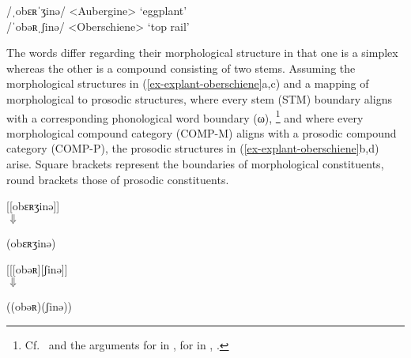 \documentclass[output=paper
 ,nobabel
 ,draftmode
 ,colorlinks, citecolor=brown
]{langscibook}
\begin{document}
/ˌobɛʀˈʒinə/ <Aubergine>    `eggplant'\\

\ex\label{ex-oberschiene}
/ˈobəʀˌʃinə/ <Oberschiene> `top rail'
\zl

\largerpage
\noindent
The words differ regarding their morphological structure in that one is a simplex whereas the other is a compound consisting of two stems. Assuming the morphological structures in (\ref{ex-explant-oberschiene}a,c) and a mapping of morphological to prosodic structures, where every stem (STM) boundary aligns with a corresponding phonological word boundary (ω),%
%
\footnote{Cf.\ \citet{NesporVogel2007} and the arguments for  in \citet{Raffelsiefen1999},
  for  in \citet[cf.\ footnote 12]{Wiese2000}, \citet{Raffelsiefen2000}.} and where every
morphological compound category (COMP-M) aligns with a prosodic compound category (COMP-P), the
prosodic structures in (\ref{ex-explant-oberschiene}b,d) arise. Square brackets represent the
boundaries of morphological constituents, round brackets those of prosodic constituents. 

\ea
\label{ex-explant-oberschiene}
\begin{multicols}{2}
\ea\label{ex-eggplant-stm}
[[obɛʀʒinə]]\\

\hphantom{[[obɛ}$\Downarrow$

\ex\label{ex-eggplant-comp}
(obɛʀʒinə)

\columnbreak

\ex\label{ex-oberschiene-stm}
[[[obəʀ][ʃinə]]\\

\hphantom{[[[obəʀ]\sub{STM}}$\Downarrow$

\ex\label{ex-oberschiene-comp}
((obəʀ)(ʃinə))
\z
	
\end{multicols}
\z
\end{document}
